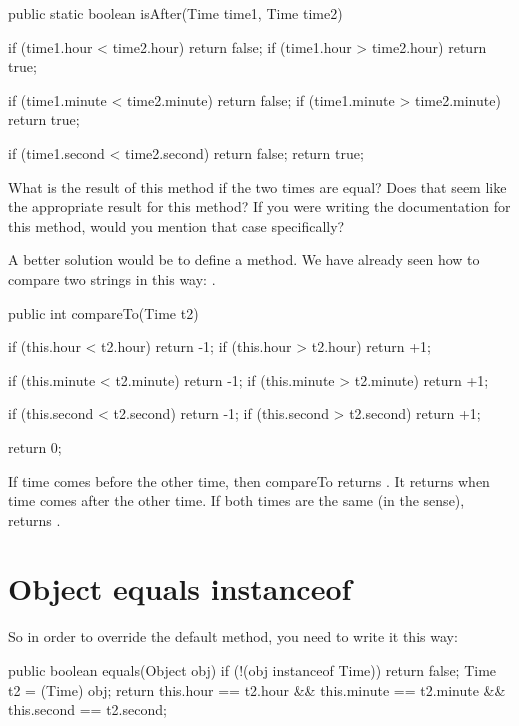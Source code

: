 \begin{code}
    public static boolean isAfter(Time time1, Time time2) {
        if (time1.hour < time2.hour) return false;
        if (time1.hour > time2.hour) return true;

        if (time1.minute < time2.minute) return false;
        if (time1.minute > time2.minute) return true;

        if (time1.second < time2.second) return false;
        return true;
    }
\end{code}

What is the result of this method if the two times are equal?
Does that seem like the appropriate result for this method?
If you were writing the documentation for this method, would you mention that case specifically?

A better solution would be to define a  method.
We have already seen how to compare two strings in this way: .

\begin{code}
    public int compareTo(Time t2) {
        if (this.hour < t2.hour) return -1;
        if (this.hour > t2.hour) return +1;

        if (this.minute < t2.minute) return -1;
        if (this.minute > t2.minute) return +1;

        if (this.second < t2.second) return -1;
        if (this.second > t2.second) return +1;

        return 0;
    }
\end{code}

If  time comes before the other time, then compareTo returns .
It returns  when  time comes after the other time.
If both times are the same (in the  sense),  returns .


\section{Object equals instanceof}


So in order to override the default  method, you need to write it this way:

\begin{code}
    public boolean equals(Object obj) {
        if (!(obj instanceof Time)) {
            return false;
        }
        Time t2 = (Time) obj;
        return this.hour == t2.hour
            && this.minute == t2.minute
            && this.second == t2.second;
    }
\end{code}

